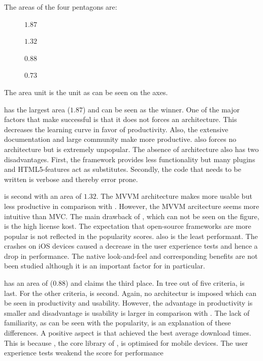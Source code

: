 \documentclass[a4paper]{artikel3}
\begin{document}
The areas of the four pentagons are:
\begin{description}
 \item [\jqm{}] $1.87$
 \item [\kendo{}] $1.32$
 \item [\lungo{}] $0.88$
 \item [\st{}] $0.73$
\end{description}

The area unit is the unit as can be seen on the axes.

\jqma{} has the largest area ($1.87$) and can be seen as the winner.
One of the major factors that make \jqma{} successful is that it does not forces an architecture.
This decreases the learning curve in favor of productivity.
Also,  the extensive documentation and large community make \jqma{} more productive.
\lungo{} also forces no architecture but is extremely unpopular.
The absence of architecture also has two disadvantages.
First,  the framework provides less functionality but many plugins and HTML5-features act as substitutes.
Secondly,  the code that needs to be written is verbose and thereby error prone.

\kendob{} is second with an area of $1.32$.
The MVVM architecture makes \kendob{} more usable but less productive in comparison with \jqma{}.
However,  the MVVM arcitecture seems more intuitive than MVC.
The main drawback of \kendob{},  which can not be seen on the figure, is the high license kost.
The expectation that open-source frameworks are more popular is not reflected in the popularity scores.
\kendob{} also is the least performant.
The crashes on iOS devices caused a decrease in the user experience tests and hence a drop in performance.
The native look-and-feel and corresponding benefits are not been studied although it is an important factor for \kendob{} in particular.

\lungo{} has an area of ($0.88$) and claims the third place.
In tree out of five criteria,  \lungo{} is last.
For the other criteria,  \lungo{} is second.
Again, no architectur is imposed which can be seen in productivity and usability.
However,  the advantage in productivity is smaller and disadvantage is usability is larger in comparison with \jqma{}.
The lack of familiarity,  as can be seen with the popularity,  is an explanation of these differences.
A positive aspect is that \lungo{} achieved the best average download times.  
This is because \quo{},  the core library of \lungo{},  is optimised for mobile devices.
The user experience tests weakend the score for performance
\end{document}
